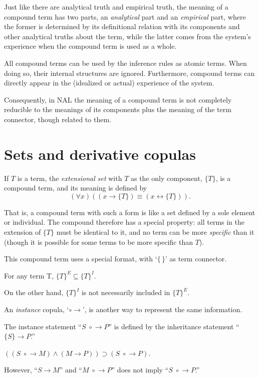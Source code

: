 Just like there are analytical truth and empirical truth, the meaning of a compound term has two parts, an {\em analytical} part and an {\em empirical} part, where the former is determined by its definitional relation with its components and other analytical truths about the term, while the latter comes from the system's experience when the compound term is used as a whole.  

All compound terms can be used by the inference rules as atomic terms. When doing so, their internal structures are ignored. Furthermore, compound terms can directly appear in the (idealized or actual) experience of the system.

Consequently, in NAL the meaning of a compound term is not completely reducible to the meanings of its components plus the meaning of the term connector, though related to them.


\section{Sets and derivative copulas}

\begin{defi}
If $T$ is a term, the {\em extensional set} with $T$ as the only component, \(\{T\}\), is a compound term, and its meaning is defined by
\[(\forall x) ((x \rightarrow \{T\}) \equiv (x \leftrightarrow \{T\})).\]
\end{defi}
That is, a compound term with such a form is like a set defined by a sole element or individual.  The compound therefore has a special property: all terms in the extension of \(\{T\}\) must be identical to it, and no term can be more \emph{specific} than it (though it is possible for some terms to be more specific than \(T\)).

This compound term uses a special format, with `$\{\,\}$' as term connector.

\begin{theo}
For any term T, \(\{T\}^E \subseteq \{T\}^I\).
\end{theo}
On the other hand, ${\{T\}}^I$ is not necessarily included in ${\{T\}}^E$.

An {\em instance} copula, `$\circ\!\!\rightarrow$', is another way to represent the same information.
\begin{defi}
The instance statement ``\(S \;\circ\!\!\rightarrow P\)'' is defined by the inheritance statement ``\(\{S\} \rightarrow P\).''
\end{defi}

\begin{theo}
\(((S \;\circ\!\!\rightarrow M) \wedge (M \rightarrow P)) \supset (S \;\circ\!\!\rightarrow P)\).
\end{theo}
However, ``\(S \rightarrow M\)'' and ``\(M \;\circ\!\!\rightarrow P\)'' does not imply ``\(S \;\circ\!\!\rightarrow P\).''

